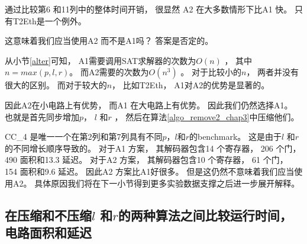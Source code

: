 通过比较第6 和11列中的整体时间开销，
很显然
A2 在大多数情形下比A1 快。
只有T2Eth是一个例外。

这意味着我们应当使用A2 而不是A1吗？
答案是否定的。

从小节\ref{alter}可知，
A1需要调用SAT求解器的次数为$O(n)$ ，
其中$n=max(p,l,r)$。
而A2需要的次数为$O(n^3)$ 。
对于比较小的$n$，
两者并没有很大的区别。
而对于较大的$n$，
比如T2Eth，
A1对A2的优势是显著的。

因此A2在小电路上有优势，
而A1 在大电路上有优势。
因此我们仍然选择A1。
也就是首先同步增加$p$， $l$ 和$r$ ，
然后在算法\ref{algo_remove2_chap3}中压缩他们。

CC\_4 是唯一一个在第2列和第7列具有不同$p$，$l$和$r$的benchmark。
这是由于$l$ 和$r$的不同增长顺序导致的。
对于A1 方案，
其解码器包含14 个寄存器， 206 个门， 490 面积和13.3 延迟。
对于A2 方案，
其解码器包含10 个寄存器， 61 个门， 154 面积和9.6 延迟。
因此A2 方案比A1好很多。
但是这仍然不意味着我们应当使用A2。
具体原因我们将在下一小节得到更多实验数据支撑之后进一步展开解释。

\subsection{在压缩和不压缩$l$ 和$r$的两种算法之间比较运行时间，电路面积和延迟}\label{subsec_min}

